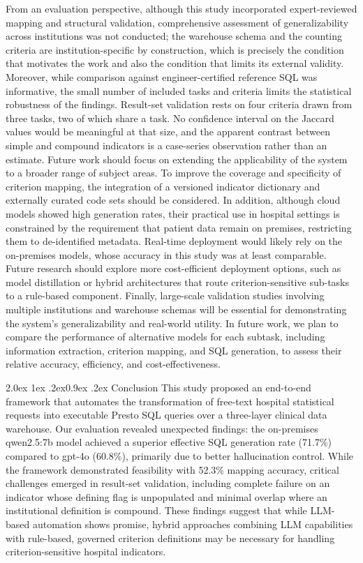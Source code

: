 \documentclass[10pt,twocolumn]{article}
\makeatletter
\renewcommand\subsection{\@startsection{subsection}{2}{\z@}%
  {2.0ex \@plus 1ex \@minus .2ex}{0.9ex \@plus .2ex}%
  {\normalfont\normalsize\bfseries}}
\makeatother
\begin{document}
From an evaluation perspective, although this study incorporated expert-reviewed mapping and structural validation, comprehensive assessment of generalizability across institutions was not conducted; the warehouse schema and the counting criteria
are institution-specific by construction, which is precisely the condition that
motivates the work and also the condition that limits its external validity.
Moreover, while comparison against engineer-certified reference SQL was informative, the small number of included tasks and criteria limits the statistical robustness of the findings. Result-set validation rests on four criteria drawn from three tasks, two of which share a task. No confidence interval on the Jaccard values would be meaningful at that size, and the apparent contrast between simple and compound indicators is a case-series observation rather than an estimate. Future work should focus on extending
the applicability of the system to a broader range of subject areas. To improve
the coverage and specificity of criterion mapping, the integration of a
versioned indicator dictionary and externally curated code sets should be
considered. In addition, although cloud models showed high generation rates,
their practical use in hospital settings is constrained by the requirement that
patient data remain on premises, restricting them to de-identified metadata.
Real-time deployment would likely rely on the on-premises models, whose accuracy
in this study was at least comparable. Future research should explore more
cost-efficient deployment options, such as model distillation or hybrid
architectures that route criterion-sensitive sub-tasks to a rule-based
component. Finally, large-scale validation studies involving multiple
institutions and warehouse schemas will be essential for demonstrating the
system's generalizability and real-world utility. In future work, we plan to
compare the performance of alternative models for each subtask, including
information extraction, criterion mapping, and SQL generation, to assess their
relative accuracy, efficiency, and cost-effectiveness.

\subsection{Conclusion}
This study proposed an end-to-end framework that automates the transformation of
free-text hospital statistical requests into executable Presto SQL queries over
a three-layer clinical data warehouse. Our evaluation revealed unexpected
findings: the on-premises qwen2.5:7b model achieved a superior effective SQL
generation rate (71.7\%) compared to gpt-4o (60.8\%), primarily due to better
hallucination control. While the framework demonstrated feasibility with 52.3\%
mapping accuracy, critical challenges emerged in result-set validation,
including complete failure on an indicator whose defining flag is unpopulated
and minimal overlap where an institutional definition is compound. These
findings suggest that while LLM-based automation shows promise, hybrid
approaches combining LLM capabilities with rule-based, governed criterion
definitions may be necessary for handling criterion-sensitive hospital
indicators.
\end{document}
